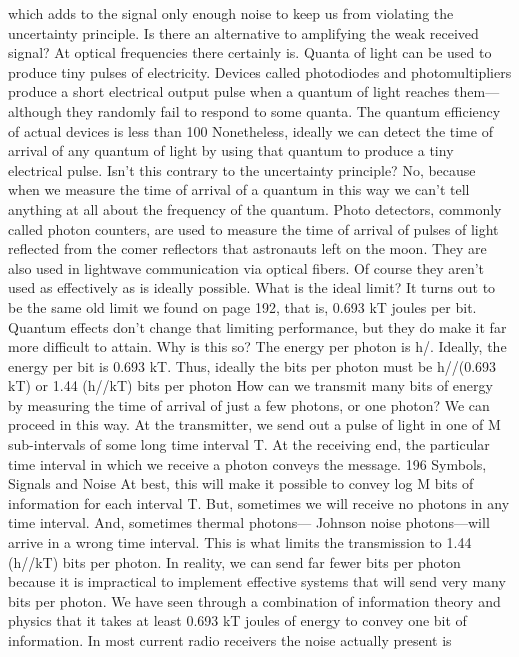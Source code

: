 {{{{{{{{{{{which adds to the signal only enough noise to keep us from violating
the uncertainty principle.
Is there an alternative to amplifying the weak received signal?
At optical frequencies there certainly is. Quanta of light can be
used to produce tiny pulses of electricity. Devices called photodiodes
and photomultipliers produce a short electrical output pulse
when a quantum of light reaches them—although they randomly
fail to respond to some quanta. The quantum efficiency of actual
devices is less than 100%
Nonetheless, ideally we can detect the time of arrival of any
quantum of light by using that quantum to produce a tiny electrical
pulse. Isn’t this contrary to the uncertainty principle? No, because
when we measure the time of arrival of a quantum in this way we
can’t tell anything at all about the frequency of the quantum.
Photo detectors, commonly called photon counters, are used to
measure the time of arrival of pulses of light reflected from the
comer reflectors that astronauts left on the moon. They are also
used in lightwave communication via optical fibers. Of course they
aren’t used as effectively as is ideally possible. What is the ideal
limit? It turns out to be the same old limit we found on page 192,
that is, 0.693 kT joules per bit. Quantum effects don’t change that
limiting performance, but they do make it far more difficult to
attain. Why is this so?
The energy per photon is h/. Ideally, the energy per bit is 0.693
kT. Thus, ideally the bits per photon must be
h//(0.693 kT)
or
1.44 (h//kT) bits per photon
How can we transmit many bits of energy by measuring the time
of arrival of just a few photons, or one photon? We can proceed
in this way. At the transmitter, we send out a pulse of light in one
of M sub-intervals of some long time interval T. At the receiving
end, the particular time interval in which we receive a photon
conveys the message.
196 Symbols, Signals and Noise
At best, this will make it possible to convey log M bits of information
for each interval T. But, sometimes we will receive no
photons in any time interval. And, sometimes thermal photons—
Johnson noise photons—will arrive in a wrong time interval. This
is what limits the transmission to 1.44 (h//kT) bits per photon.
In reality, we can send far fewer bits per photon because it is
impractical to implement effective systems that will send very many
bits per photon.
We have seen through a combination of information theory and
physics that it takes at least 0.693 kT joules of energy to convey
one bit of information.
In most current radio receivers the noise actually present is
}}}}}}}}}}}
